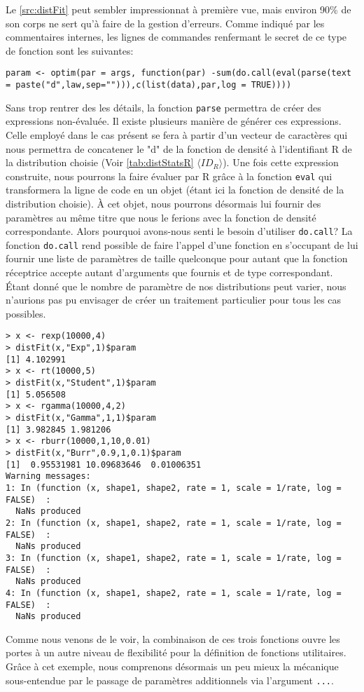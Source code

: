 Le \autoref{src:distFit} peut sembler impressionnat à première vue, mais environ 90\% de son corps ne sert qu'à faire de la gestion d'erreurs. Comme indiqué par les commentaires internes, les lignes de commandes renfermant le secret de ce type de fonction sont les suivantes: \\

\begin{minipage}{\linewidth}
	\noindent
	\texttt{param <- optim(par = args, function(par) -sum(do.call(eval(parse(text = paste("d",law,sep=""))),c(list(data),par,log = TRUE))))}
\end{minipage}

\vspace{\baselineskip}
Sans trop rentrer des les détails, la fonction \texttt{parse} permettra de créer des expressions non-évaluée. Il existe plusieurs manière de générer ces expressions. Celle employé dans le cas présent se fera à partir d'un vecteur de caractères qui nous permettra de concatener le "d" de la fonction de densité à l'identifiant R de la distribution choisie (Voir \autoref{tab:distStatsR} $\langle ID_R \rangle$). Une fois cette expression construite, nous pourrons la faire évaluer par R grâce à la fonction \texttt{eval} qui transformera la ligne de code en un objet (étant ici la fonction de densité de la distribution choisie). À cet objet, nous pourrons désormais lui fournir des paramètres au même titre que nous le ferions avec la fonction de densité correspondante. Alors pourquoi avons-nous senti le besoin d'utiliser \texttt{do.call}? La fonction \texttt{do.call} rend possible de faire l'appel d'une fonction en s'occupant de lui fournir une liste de paramètres de taille quelconque pour autant que la fonction réceptrice accepte autant d'arguments que fournis et de type correspondant. Étant donné que le nombre de paramètre de nos distributions peut varier, nous n'aurions pas pu envisager de créer un traitement particulier pour tous les cas possibles.

\begin{lstlisting}[caption = Exemple d'utilisation de la fonction \texttt{distFit},label=src:distFistEx]
> x <- rexp(10000,4)
> distFit(x,"Exp",1)$param
[1] 4.102991
> x <- rt(10000,5)
> distFit(x,"Student",1)$param
[1] 5.056508
> x <- rgamma(10000,4,2)
> distFit(x,"Gamma",1,1)$param
[1] 3.982845 1.981206
> x <- rburr(10000,1,10,0.01)
> distFit(x,"Burr",0.9,1,0.1)$param
[1]  0.95531981 10.09683646  0.01006351
Warning messages:
1: In (function (x, shape1, shape2, rate = 1, scale = 1/rate, log = FALSE)  :
  NaNs produced
2: In (function (x, shape1, shape2, rate = 1, scale = 1/rate, log = FALSE)  :
  NaNs produced
3: In (function (x, shape1, shape2, rate = 1, scale = 1/rate, log = FALSE)  :
  NaNs produced
4: In (function (x, shape1, shape2, rate = 1, scale = 1/rate, log = FALSE)  :
  NaNs produced
\end{lstlisting}

Comme nous venons de le voir, la combinaison de ces trois fonctions ouvre les portes à un autre niveau de flexibilité pour la définition de fonctions utilitaires. Grâce à cet exemple, nous comprenons désormais un peu mieux la mécanique sous-entendue par le passage de paramètres additionnels via l'argument \texttt{...}.